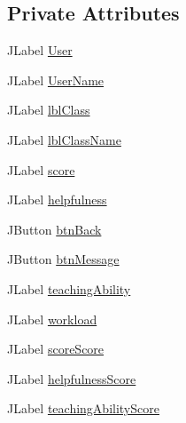 \subsection*{Private Attributes}
\begin{DoxyCompactItemize}
\item 
J\+Label \mbox{\hyperlink{classcom_1_1_b_n_u_1_1pages_1_1_user_review_1_1_user_review_model_ac967b25fe8fd2fb0ec74509b21ed40fe}{User}}
\item 
J\+Label \mbox{\hyperlink{classcom_1_1_b_n_u_1_1pages_1_1_user_review_1_1_user_review_model_ab0f8d05ee234354f99d90667a32f5e56}{User\+Name}}
\item 
J\+Label \mbox{\hyperlink{classcom_1_1_b_n_u_1_1pages_1_1_user_review_1_1_user_review_model_a78a8effcdf299c2db639d978695e91e8}{lbl\+Class}}
\item 
J\+Label \mbox{\hyperlink{classcom_1_1_b_n_u_1_1pages_1_1_user_review_1_1_user_review_model_ad090b36696f4ac41ebe4ea2fa9bdc927}{lbl\+Class\+Name}}
\item 
J\+Label \mbox{\hyperlink{classcom_1_1_b_n_u_1_1pages_1_1_user_review_1_1_user_review_model_aa6eb93371aaefcd29396ba548e525da1}{score}}
\item 
J\+Label \mbox{\hyperlink{classcom_1_1_b_n_u_1_1pages_1_1_user_review_1_1_user_review_model_a78d624dc5321ecae6f915eda06d0c473}{helpfulness}}
\item 
J\+Button \mbox{\hyperlink{classcom_1_1_b_n_u_1_1pages_1_1_user_review_1_1_user_review_model_a0a323961d475aa6630c109161ce3b254}{btn\+Back}}
\item 
J\+Button \mbox{\hyperlink{classcom_1_1_b_n_u_1_1pages_1_1_user_review_1_1_user_review_model_ab1ce8a46f7b3260f427625e0ae87c18d}{btn\+Message}}
\item 
J\+Label \mbox{\hyperlink{classcom_1_1_b_n_u_1_1pages_1_1_user_review_1_1_user_review_model_a32b78eb41442410c056a144960a69948}{teaching\+Ability}}
\item 
J\+Label \mbox{\hyperlink{classcom_1_1_b_n_u_1_1pages_1_1_user_review_1_1_user_review_model_af7a21fe3488541f9a907c5f420911ce1}{workload}}
\item 
J\+Label \mbox{\hyperlink{classcom_1_1_b_n_u_1_1pages_1_1_user_review_1_1_user_review_model_af31ec5de5680354fd4e3a7db08065d1c}{score\+Score}}
\item 
J\+Label \mbox{\hyperlink{classcom_1_1_b_n_u_1_1pages_1_1_user_review_1_1_user_review_model_a42750e8e10b6109a40d3937d68537dde}{helpfulness\+Score}}
\item 
J\+Label \mbox{\hyperlink{classcom_1_1_b_n_u_1_1pages_1_1_user_review_1_1_user_review_model_aef2f1e80402a3776de0547932081c41a}{teaching\+Ability\+Score}}

\end{DoxyCompactItemize}
